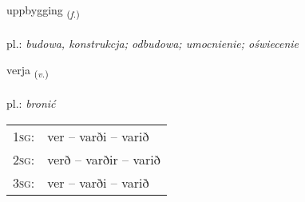 \documentclass[frontgrid, backgrid]{flacards}\usepackage[]{graphicx}\usepackage[]{xcolor}
\begin{document}
{uppbygging \small{\textsubscript{(\textit{f.})}} \\[1ex] %
\textphonetic{[ʏhpɪciŋk]} \\
pl.: \emph{budowa, konstrukcja; odbudowa; umocnienie; oświecenie} \\  [2ex]
\renewcommand*{\arraystretch}{0.8}
}

\renewcommand{\flhead}{\vskip5pt \fboxsep=0pt {\small\bfseries\footnotesize Lýsingarorð | czasownik}}
\renewcommand{\fcfoot}{\vskip5pt \fboxsep=0pt \hspace{2pt}{\small\bfseries\footnotesize 1K}}

\renewcommand{\blhead}{\vskip5pt {\small\bfseries\footnotesize Lýsingarorð | czasownik }}
\renewcommand{\bcfoot}{\vskip5pt \hspace{2pt}{\small\bfseries\footnotesize 1K}}


{verja \small{\textsubscript{(\textit{v.})}} \\[1ex] %
\textphonetic{[vɛrja]} \\
pl.: \emph{bronić} \\  [2ex]
\renewcommand*{\arraystretch}{0.8}
\begin{tabular}{p{1cm}l}
\textsc{1sg}: & ver -- varði -- varið \\ 
\textsc{2sg}: & verð -- varðir -- varið \\ 
\textsc{3sg}: & ver -- varði -- varið \\ 
\end{tabular}
}


\renewcommand{\flhead}{\vskip5pt \fboxsep=0pt {\small\bfseries\footnotesize Atviksorð | przysłówek}}
\renewcommand{\fcfoot}{\vskip5pt \fboxsep=0pt \hspace{2pt}{\small\bfseries\footnotesize 1K}}
\end{document}
